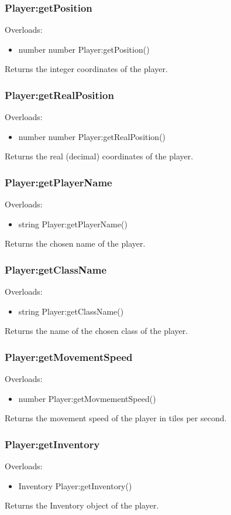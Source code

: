 \documentclass{book}
\newenvironment{ulist}
	{\begin{itemize}
			\itemsep0em}
	{\end{itemize}}
\begin{document}
\subsubsection{Player:getPosition}
Overloads:
\begin{ulist}
	\item number number Player:getPosition()
\end{ulist}
Returns the integer coordinates of the player.

\subsubsection{Player:getRealPosition}
Overloads:
\begin{ulist}
	\item number number Player:getRealPosition()
\end{ulist}
Returns the real (decimal) coordinates of the player.

\subsubsection{Player:getPlayerName}
Overloads:
\begin{ulist}
	\item string Player:getPlayerName()
\end{ulist}
Returns the chosen name of the player.

\subsubsection{Player:getClassName}
Overloads:
\begin{ulist}
	\item string Player:getClassName()
\end{ulist}
Returns the name of the chosen class of the player.

\subsubsection{Player:getMovementSpeed}
Overloads:
\begin{ulist}
	\item number Player:getMovmementSpeed()
\end{ulist}
Returns the movement speed of the player in tiles per second.

\subsubsection{Player:getInventory}
Overloads:
\begin{ulist}
	\item Inventory Player:getInventory()
\end{ulist}
Returns the Inventory object of the player.
\end{document}
